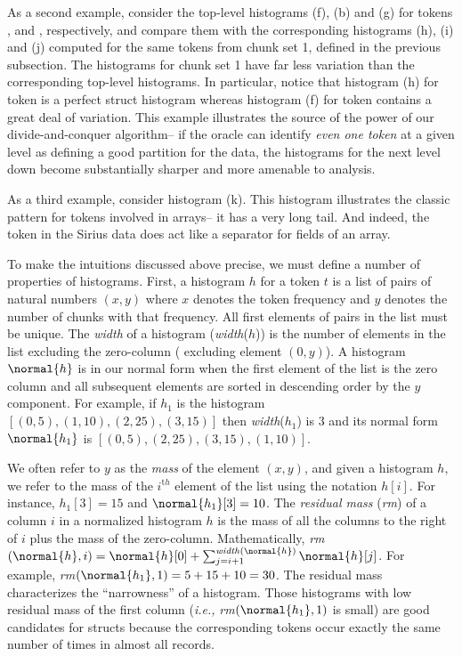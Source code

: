 As a second example, consider the top-level histograms (f), (b) and
(g) for tokens ,  and , respectively, 
and compare them with the corresponding histograms (h),
(i) and (j) computed for the same tokens from chunk set 1, defined in the
previous subsection.  The histograms for chunk set 1 have far less variation
than the corresponding top-level histograms.  In particular, notice
that histogram (h) for token  is a perfect struct histogram
whereas histogram (f) for token 
contains a great deal of variation.  This example illustrates the
source of the power of our divide-and-conquer algorithm-- if the
oracle can identify {\em even one token} at a given level as
defining a good partition for the data, the histograms for the next
level down become substantially sharper and more amenable to analysis.

As a third example, consider histogram (k).  This histogram illustrates
the classic pattern for tokens involved in arrays-- it has a very long
tail.  And indeed, the \cd{|} token in the Sirius data does act like a
separator for fields of an array. 

To make the intuitions discussed above precise, we must define a number of
properties of histograms.  First, a histogram $h$ for a token $t$ is a list of pairs
of natural numbers $(x,y)$ where $x$ denotes the token frequency and
$y$ denotes the number of chunks with that frequency.  
All first elements of pairs in the list must be unique.  
The {\em width} of a
histogram ({\em width}($h$)) is the number of elements in the list
excluding the zero-column (\ie{} excluding element $(0,y)$).  
A histogram
$\normal{h}$ is in our normal form when the first element of the list is
the zero column and all subsequent elements are sorted in descending
order by the $y$ component.  For example, if $h_1$ is the histogram
$[(0,5), (1,10), (2,25), (3,15)]$ then {\em width}($h_1$) is 3 and its
normal form $\normal{h_1}$ is $[(0,5), (2, 25), (3,15), (1,10)]$.

We often refer to $y$ as the {\em mass} of the element $(x,y)$,
and given a histogram $h$, we refer to the mass of the $i^{\mathrm th}$
element of the list 
using the notation $h[i]$.  For instance, $h_1[3] = 15$ and 
$\normal{h_1}[3] = 10$.  The {\em residual mass} ({\em rm}) of a column $i$ in 
a normalized histogram $h$ is the mass of all the columns to the right of 
$i$ plus the mass of the zero-column.  Mathematically, 
{\em rm}$(\normal{h},i) = \normal{h}[0] + \sum_{j=i+1}^{\mathit{width}(\normal{h})} \normal{h}[j]$.
For example, {\em rm}$(\normal{h_1},1) = 5 + 15 + 10 = 30$.
The residual mass characterizes the ``narrowness''
of a histogram.  Those histograms with low residual mass of the first
column ({\em i.e.,} {\em rm}$(\normal{h_1},1)$ is small) 
are good candidates for structs because the corresponding tokens 
occur exactly the same number of times in almost all records.

